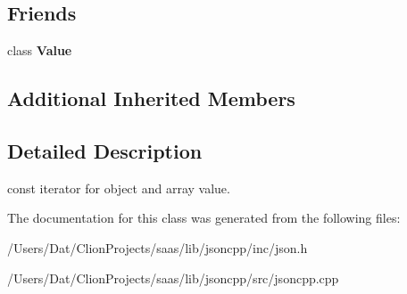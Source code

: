 \subsection*{Friends}
\begin{DoxyCompactItemize}
\item 
class {\bfseries Value}\hypertarget{class_json_1_1_value_const_iterator_aeceedf6e1a7d48a588516ce2b1983d6f}{}\label{class_json_1_1_value_const_iterator_aeceedf6e1a7d48a588516ce2b1983d6f}

\end{DoxyCompactItemize}
\subsection*{Additional Inherited Members}


\subsection{Detailed Description}
const iterator for object and array value. 



The documentation for this class was generated from the following files\+:\begin{DoxyCompactItemize}
\item 
/\+Users/\+Dat/\+Clion\+Projects/saas/lib/jsoncpp/inc/json.\+h\item 
/\+Users/\+Dat/\+Clion\+Projects/saas/lib/jsoncpp/src/jsoncpp.\+cpp\end{DoxyCompactItemize}
